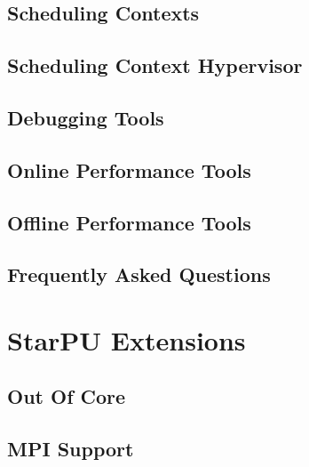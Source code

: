 \chapter{Scheduling Contexts}
\label{SchedulingContexts}
\hypertarget{SchedulingContexts}{}


\chapter{Scheduling Context Hypervisor}
\label{SchedulingContextHypervisor}
\hypertarget{SchedulingContextHypervisor}{}


\chapter{Debugging Tools}
\label{DebuggingTools}
\hypertarget{DebuggingTools}{}


\chapter{Online Performance Tools}
\label{OnlinePerformanceTools}
\hypertarget{OnlinePerformanceTools}{}


\chapter{Offline Performance Tools}
\label{OfflinePerformanceTools}
\hypertarget{OfflinePerformanceTools}{}


\chapter{Frequently Asked Questions}
\label{FrequentlyAskedQuestions}
\hypertarget{FrequentlyAskedQuestions}{}


\part{StarPU Extensions}

\chapter{Out Of Core}
\label{OutOfCore}
\hypertarget{OutOfCore}{}


\chapter{MPI Support}
\label{MPISupport}
\hypertarget{MPISupport}{}



